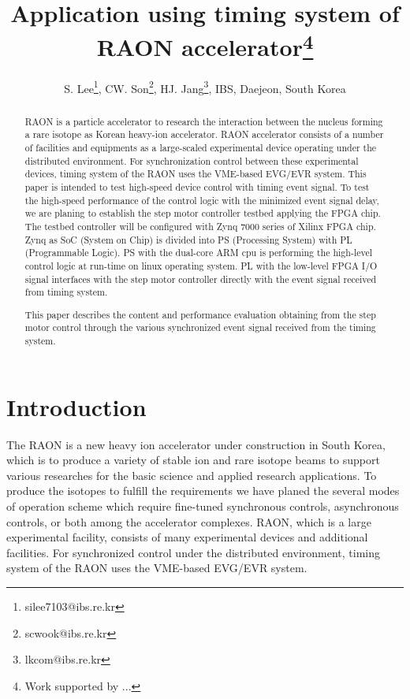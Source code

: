 \documentclass[a4paper,
              ]{jacow}
\begin{document}
\title{Application using timing system of RAON accelerator\thanks{Work supported by ...}}

\author{S. Lee\thanks{silee7103@ibs.re.kr}, CW. Son\thanks{scwook@ibs.re.kr}, HJ. Jang\thanks{lkcom@ibs.re.kr}, IBS, Daejeon, South Korea\\
       }

\maketitle

%
\begin{abstract}
   RAON is a particle accelerator to research the interaction between the nucleus forming a rare isotope as Korean heavy-ion accelerator. RAON accelerator consists of a number of facilities and equipments as a large-scaled experimental device operating under the distributed environment. For synchronization control between these experimental devices, timing system of the RAON uses the VME-based EVG/EVR system. This paper is intended to test high-speed device control with timing event signal. To test the high-speed performance of the control logic with the minimized event signal delay, we are planing to establish the step motor controller testbed applying the FPGA chip. The testbed controller will be configured with Zynq 7000 series of Xilinx FPGA chip. Zynq as SoC (System on Chip) is divided into PS (Processing System) with PL (Programmable Logic). PS with the dual-core ARM cpu is performing the high-level control logic at run-time on linux operating system. PL with the low-level FPGA I/O signal interfaces with the step motor controller directly with the event signal received from timing system.
   
   This paper describes the content and performance evaluation obtaining from the step motor control through the various synchronized event signal received from the timing system.
\end{abstract}


\section{Introduction}
The RAON\cite{TSHOO:NIMB} is a new heavy ion accelerator under construction in South Korea, which is to produce a variety of stable ion and rare isotope beams to support various researches for the basic science and applied research applications. To produce the isotopes to fulfill the requirements we have planed the several modes of operation scheme which require fine-tuned synchronous controls, asynchronous controls, or both among the accelerator complexes. RAON, which is a large experimental facility, consists of many experimental devices and additional facilities. For synchronized control under the distributed environment, timing system of the RAON uses the VME-based EVG/EVR system.
\end{document}
